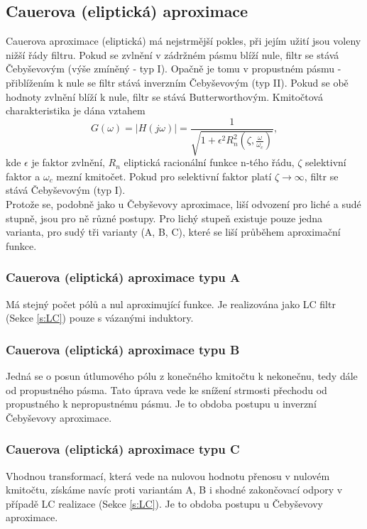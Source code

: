 \subsection{Cauerova (eliptická) aproximace}
\noindent Cauerova aproximace (eliptická) má nejstrmější pokles, při jejím užití jsou voleny nižší řády filtru. Pokud se zvlnění v zádržném pásmu blíží nule, filtr se stává Čebyševovým (výše zmíněný - typ I). Opačně je tomu v propustném pásmu - přiblížením k nule se filtr stává inverzním Čebyševovým (typ II).  Pokud se obě hodnoty zvlnění blíží k nule, filtr se stává Butterworthovým. Kmitočtová charakteristika je dána vztahem
\begin{equation}
G(\omega) = |H(j\omega)| = \frac{1}{\sqrt{1 + \epsilon ^2 R_n ^2(\zeta, \frac{\omega}{\omega _c})}},
\end{equation}
kde $\epsilon$ je faktor zvlnění, $R_n$ eliptická racionální funkce n-tého řádu, $\zeta$ selektivní faktor a $\omega _c$ mezní kmitočet. Pokud pro selektivní faktor platí $\zeta \rightarrow \infty$, filtr se stává Čebyševovým (typ I).\\
Protože se, podobně jako u Čebyševovy aproximace, liší odvození pro liché a sudé stupně, jsou pro ně různé postupy. Pro lichý stupeň existuje pouze jedna varianta, pro sudý tři varianty (A, B, C), které se liší průběhem aproximační funkce.
\subsubsection{Cauerova (eliptická) aproximace typu A}
Má stejný počet pólů a nul aproximující funkce. Je realizována jako LC filtr (Sekce \ref{s:LC}) pouze s vázanými induktory.
\subsubsection{Cauerova (eliptická) aproximace typu B}
Jedná se o posun útlumového pólu z konečného kmitočtu k nekonečnu, tedy dále od propustného pásma. Tato úprava vede ke snížení strmosti přechodu od propustného k nepropustnému pásmu. Je to obdoba postupu u inverzní Čebyševovy aproximace.
\subsubsection{Cauerova (eliptická) aproximace typu C}
Vhodnou transformací, která vede na nulovou hodnotu přenosu v nulovém kmitočtu, získáme navíc proti variantám A, B i shodné zakončovací odpory v případě LC realizace (Sekce \ref{s:LC}). Je to obdoba postupu u Čebyševovy aproximace.
